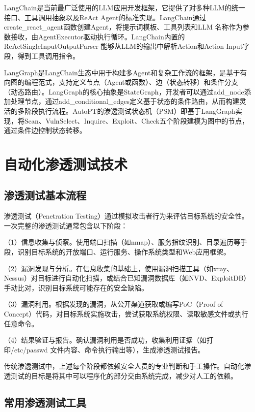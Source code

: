 LangChain\cite{LangChain}是当前最广泛使用的LLM应用开发框架，它提供了对多种LLM的统一接口、工具调用抽象以及ReAct Agent的标准实现。LangChain通过create\_react\_agent函数创建Agent，将提示词模板、工具列表和LLM 名称作为参数接收，由AgentExecutor驱动执行循环。LangChain内置的ReActSingleInputOutputParser 能够从LLM的输出中解析Action和Action Input字段，得到工具调用指令。

LangGraph是LangChain生态中用于构建多Agent和复杂工作流的框架，是基于有向图的编程范式，支持定义节点（Agent或函数）、边（状态转移）和条件分支（动态路由）。LangGraph的核心抽象是StateGraph，开发者可以通过add\_node添加处理节点，通过add\_conditional\_edges定义基于状态的条件路由，从而构建灵活的多阶段执行流程。AutoPT的渗透测试状态机（PSM）即基于LangGraph实现，将Scan、VulnSelect、Inquire、Exploit、Check五个阶段建模为图中的节点，通过条件边控制状态转移。

\section{自动化渗透测试技术}

\subsection{渗透测试基本流程}

渗透测试（Penetration Testing）通过模拟攻击者行为来评估目标系统的安全性。一次完整的渗透测试通常包含以下阶段\cite{Liu2024AutoScan}\cite{Wu2023PenTest}：

（1）信息收集与侦察。使用端口扫描（如nmap）、服务指纹识别、目录遍历等手段，识别目标系统的开放端口、运行服务、操作系统类型和Web应用框架。

（2）漏洞发现与分析。在信息收集的基础上，使用漏洞扫描工具（如xray、Nessus）对目标进行自动化扫描，或结合已知漏洞数据库（如NVD、ExploitDB）手动比对，识别目标系统可能存在的安全缺陷。

（3）漏洞利用。根据发现的漏洞，从公开渠道获取或编写PoC（Proof of Concept）代码，对目标系统实施攻击，尝试获取系统权限、读取敏感文件或执行任意命令。

（4）结果验证与报告。确认漏洞利用是否成功，收集利用证据（如打印/etc/passwd 文件内容、命令执行输出等），生成渗透测试报告。

传统渗透测试中，上述每个阶段都依赖安全人员的专业判断和手工操作。自动化渗透测试的目标是将其中可以程序化的部分交由系统完成，减少对人工的依赖。

\subsection{常用渗透测试工具}

